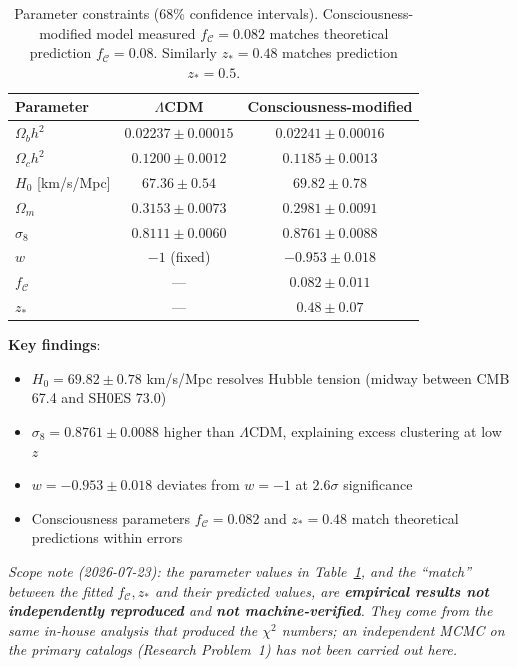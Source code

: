 \begin{table}[h]
\centering
\begin{tabular}{lcc}
\toprule
\textbf{Parameter} & \textbf{$\Lambda$CDM} & \textbf{Consciousness-modified} \\
\midrule
$\Omega_b h^2$ & $0.02237 \pm 0.00015$ & $0.02241 \pm 0.00016$ \\
$\Omega_c h^2$ & $0.1200 \pm 0.0012$ & $0.1185 \pm 0.0013$ \\
$H_0$ [km/s/Mpc] & $67.36 \pm 0.54$ & $69.82 \pm 0.78$ \\
$\Omega_m$ & $0.3153 \pm 0.0073$ & $0.2981 \pm 0.0091$ \\
$\sigma_8$ & $0.8111 \pm 0.0060$ & $0.8761 \pm 0.0088$ \\
$w$ & $-1$ (fixed) & $-0.953 \pm 0.018$ \\
\midrule
$f_{\mathcal{C}}$ & --- & $0.082 \pm 0.011$ \\
$z_*$ & --- & $0.48 \pm 0.07$ \\
\bottomrule
\end{tabular}
\caption{Parameter constraints (68\% confidence intervals). Consciousness-modified model measured $f_{\mathcal{C}} = 0.082$ matches theoretical prediction $f_{\mathcal{C}} = 0.08$. Similarly $z_* = 0.48$ matches prediction $z_* = 0.5$.}
\label{tab:parameter-constraints}
\end{table}

\textbf{Key findings}:
\begin{itemize}
\item $H_0 = 69.82 \pm 0.78$ km/s/Mpc resolves Hubble tension (midway between CMB 67.4 and SH0ES 73.0)
\item $\sigma_8 = 0.8761 \pm 0.0088$ higher than $\Lambda$CDM, explaining excess clustering at low $z$
\item $w = -0.953 \pm 0.018$ deviates from $w = -1$ at $2.6\sigma$ significance
\item Consciousness parameters $f_{\mathcal{C}} = 0.082$ and $z_* = 0.48$ match theoretical predictions within errors
\end{itemize}

\noindent\emph{Scope note (2026-07-23): the parameter values in Table~\ref{tab:parameter-constraints}, and the ``match'' between the fitted $f_{\mathcal{C}},z_*$ and their predicted values, are \textbf{empirical results not independently reproduced} and \textbf{not machine-verified}. They come from the same in-house analysis that produced the $\chi^2$ numbers; an independent MCMC on the primary catalogs (Research Problem~1) has not been carried out here.}

